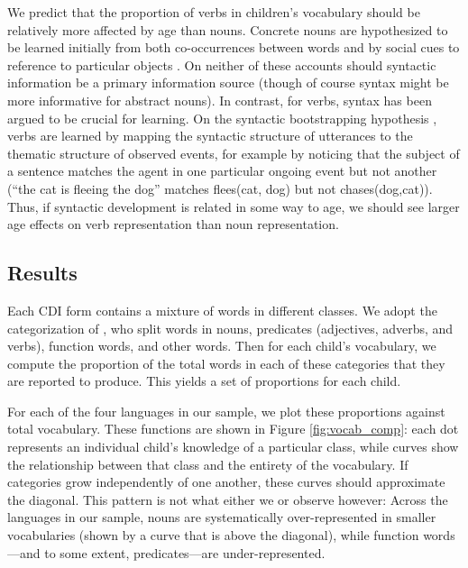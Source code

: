 \documentclass[10pt,letterpaper]{article}
\begin{document}
We predict that the proportion of verbs in children's vocabulary should be relatively more affected by age than nouns. Concrete nouns are hypothesized to be learned initially from both co-occurrences between words \cite{yu2007b} and by social cues to reference to particular objects \cite{bloom2002}. On neither of these accounts should syntactic information be a primary information source (though of course syntax might be more informative for abstract nouns). In contrast, for verbs, syntax has been argued to be crucial for learning. On the syntactic bootstrapping hypothesis \cite{gleitman1990,fisher1991}, verbs are learned by  mapping the syntactic structure of utterances to the thematic structure of observed events, for example by noticing that the subject of a sentence matches the agent in one particular ongoing event but not another (``the cat is fleeing the dog'' matches  {\sc flees(cat, dog)} but not {\sc chases(dog,cat)}). Thus, if syntactic development is related in some way to age, we should see larger age effects on verb representation than noun representation. 

\subsection{Results}

Each CDI form contains a mixture of words in different classes. We adopt the categorization of , who split words in nouns, predicates (adjectives, adverbs, and verbs), function words, and other words. Then for each child's vocabulary, we compute the proportion of the total words in each of these categories that they are reported to produce. This yields a set of proportions for each child.

For each of the four languages in our sample, we plot these proportions against total vocabulary. These functions are shown in Figure \ref{fig:vocab_comp}: each dot represents an individual child's knowledge of a particular class, while curves show the relationship between that class and the entirety of the vocabulary. If categories grow independently of one another, these curves should approximate the diagonal. This pattern is not what either we or \citeauthor{bates1994} observe however: Across the languages in our sample, nouns are systematically over-represented in smaller vocabularies (shown by a curve that is above the diagonal), while function words---and to some extent, predicates---are under-represented. 
\end{document}
